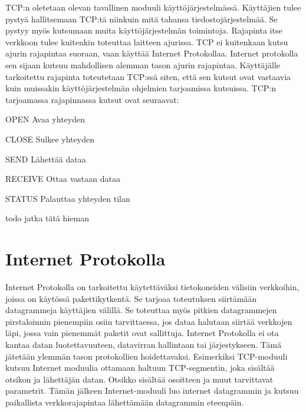 \documentclass[utf8]{gradu3}
\begin{document}
TCP:n oletetaan olevan tavallinen moduuli käyttöjärjestelmässä. Käyttäjien tulee pystyä hallitsemaan TCP:tä niinkuin mitä tahansa tiedostojärjestelmää. Se pystyy myös kutsumaan muita käyttöjärjestelmän toimintoja. Rajapinta itse verkkoon tulee kuitenkin toteuttaa laitteen ajurissa. TCP ei kuitenkaan kutsu ajurin rajapintaa suoraan, vaan käyttää Internet Protokollaa. Internet protokolla sen sijaan kutsuu mahdollisen alemman tason ajurin rajapintaa. Käyttäjälle tarkoitettu rajapinta toteutetaan TCP:ssä siten, että sen kutsut ovat vastaavia kuin muissakin käyttöjärjestelmän ohjelmien tarjoamissa kutsuissa.  TCP:n tarjoamassa rajapinnassa kutsut ovat seuraavat:

\begin{desclist}
\item[OPEN] Avaa yhteyden
\item[CLOSE] Sulkee yhteyden
\item[SEND] Lähettää dataa
\item[RECEIVE] Ottaa vastaan dataa
\item[STATUS] Palauttaa yhteyden tilan
\end{desclist}

todo jatka tätä hieman


\cite{tcp2_3}

\section{Internet Protokolla}

Internet Protokolla on tarkoitettu käytettäväksi tietokoneiden välisiin verkkoihin, joissa on käytössä pakettikytkentä. Se tarjoaa toteutuksen siirtämään datagrammeja käyttäjien välillä. Se toteuttaa myös pitkien datagrammejen pirstaloinnin pienempiin osiin tarvittaessa, jos dataa halutaan siirtää verkkojen läpi, jossa vain pienemmät paketit ovat sallittuja. Internet Protokolla ei ota kantaa datan luotettavuuteen, datavirran hallintaan tai järjestykseen. Tämä jätetään ylemmän tason protokollien hoidettavaksi. Esimerkiksi TCP-moduuli kutsuu Internet moduulia ottamaan haltuun TCP-segmentin, joka sisältää otsikon ja lähettäjän datan. Otsikko sisältää osoitteen ja muut tarvittavat parametrit. Tämän jälkeen Internet-moduuli luo internet datagrammin ja kutsuu paikallista verkkorajapintaa lähettämään datagrammin eteenpäin. \cite{internet_protocol}
\end{document}
